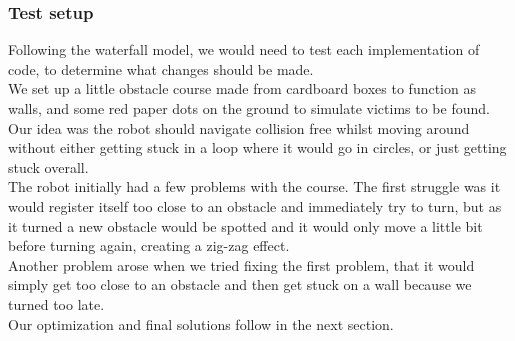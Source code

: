 \documentclass[conference]{IEEEtran}
\begin{document}
\subsubsection{Test setup}
Following the waterfall model, we would need to test each implementation of code, to determine what changes should be made.\\
We set up a little obstacle course made from cardboard boxes to function as walls, and some red paper dots on the ground 
to simulate victims to be found. Our idea was the robot should navigate collision free whilst moving around without either 
getting stuck in a loop where it would go in circles, or just getting stuck overall. \\
The robot initially had a few problems with the course. The first struggle was it would register itself too close to an 
obstacle and immediately try to turn, but as it turned a new obstacle would be spotted and it would only move a little 
bit before turning again, creating a zig-zag effect. \\Another problem arose when we tried fixing the first problem, that 
it would simply get too close to an obstacle and then get stuck on a wall because we turned too late. \\
Our optimization and final solutions follow in the next section.
\\
\vspace*{2pt}\\
\end{document}
